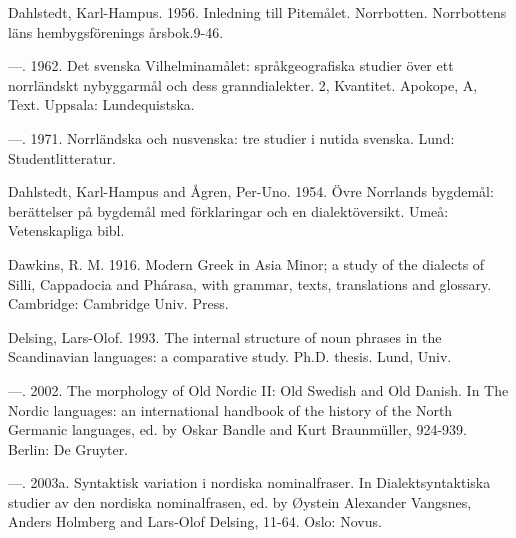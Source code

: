 Dahlstedt, Karl-Hampus. 1956. Inledning till Pitemålet. Norrbotten. Norrbottens läns hembygsförenings årsbok.9-46.


—. 1962. Det svenska Vilhelminamålet: språkgeografiska studier över ett norrländskt nybyggarmål och dess granndialekter. 2, Kvantitet. Apokope, A, Text. Uppsala: Lundequistska.


—. 1971. Norrländska och nusvenska: tre studier i nutida svenska. Lund: Studentlitteratur.


Dahlstedt, Karl-Hampus and Ågren, Per-Uno. 1954. Övre Norrlands bygdemål: berättelser på bygdemål med förklaringar och en dialektöversikt. Umeå: Vetenskapliga bibl.


Dawkins, R. M. 1916. Modern Greek in Asia Minor; a study of the dialects of Silli, Cappadocia and Phárasa, with grammar, texts, translations and glossary. Cambridge: Cambridge Univ. Press.


Delsing, Lars-Olof. 1993. The internal structure of noun phrases in the Scandinavian languages: a comparative study. Ph.D. thesis. Lund, Univ.


—. 2002. The morphology of Old Nordic II: Old Swedish and Old Danish. In The Nordic languages: an international handbook of the history of the North Germanic languages, ed. by Oskar Bandle and Kurt Braunmüller, 924-939. Berlin: De Gruyter.


—. 2003a. Syntaktisk variation i nordiska nominalfraser. In Dialektsyntaktiska studier av den nordiska nominalfrasen, ed. by Øystein Alexander Vangsnes, Anders Holmberg and Lars-Olof Delsing, 11-64. Oslo: Novus.


